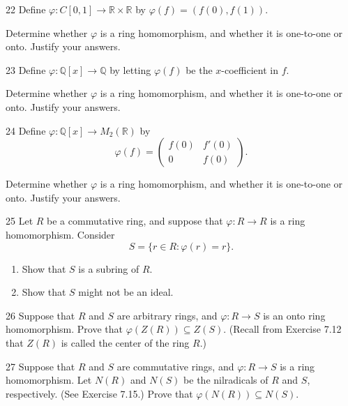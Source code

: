 \begin{problem}{22}
    Define $\varphi : C[0, 1] \to \mathbb{R} \times \mathbb{R}$ by $\varphi(f) = (f(0), f(1))$.

    Determine whether $\varphi$ is a ring homomorphism, and whether it is
    one-to-one or onto. Justify your answers.
\end{problem}
\unsolved

\begin{problem}{23}
    Define $\varphi : \mathbb{Q}[x] \to \mathbb{Q}$ by letting $\varphi(f)$ be the $x$-coefficient in $f$.

    Determine whether $\varphi$ is a ring homomorphism, and whether it is
    one-to-one or onto. Justify your answers.
\end{problem}
\unsolved

\begin{problem}{24}
    Define $\varphi : \mathbb{Q}[x] \to M_2(\mathbb{R})$ by
    \[\varphi(f) = \begin{pmatrix} f(0) & f'(0) \\ 0 & f(0) \end{pmatrix}.\]

    Determine whether $\varphi$ is a ring homomorphism, and whether it is
    one-to-one or onto. Justify your answers.
\end{problem}
\unsolved

\begin{problem}{25}
    Let $R$ be a commutative ring, and suppose that $\varphi : R \to R$ is a ring
    homomorphism. Consider
    \[S = \{r \in R : \varphi(r) = r\}.\]
    \begin{enumerate}
        \item[(a)] Show that $S$ is a subring of $R$.
        \item[(b)] Show that $S$ might not be an ideal.
    \end{enumerate}
\end{problem}
\unsolved

\begin{problem}{26}
    Suppose that $R$ and $S$ are arbitrary rings, and $\varphi : R \to S$ is an onto ring
    homomorphism. Prove that $\varphi(Z(R)) \subseteq Z(S)$. (Recall from Exercise 7.12
    that $Z(R)$ is called the center of the ring $R$.)
\end{problem}
\unsolved

\begin{problem}{27}
    Suppose that $R$ and $S$ are commutative rings, and $\varphi : R \to S$ is a ring
    homomorphism. Let $N(R)$ and $N(S)$ be the nilradicals of $R$ and $S$, respectively.
    (See Exercise 7.15.) Prove that $\varphi(N(R)) \subseteq N(S)$.
\end{problem}
\unsolved

